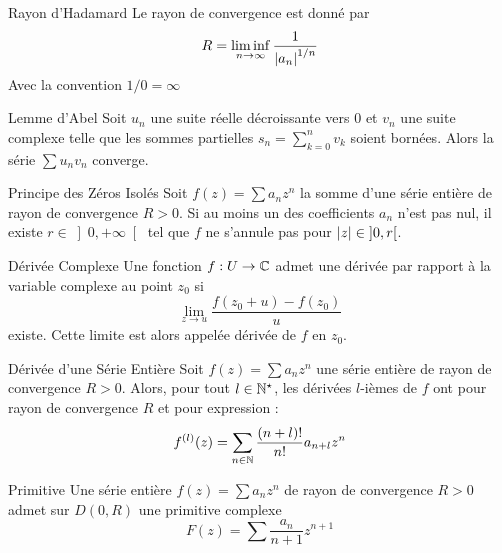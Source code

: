\documentclass{cours}
\begin{document}
\begin{propositionfr}{Rayon d'Hadamard}{}
    Le rayon de convergence est donné par 
    \[
        R = \liminf_{n \to \infty}\frac{1}{\left|a_{n}\right|^{1/n}}
    \]
    Avec la convention $1/0 = \infty$
\end{propositionfr}

\begin{lemme}{Lemme d'Abel}{}
    Soit $u_{n}$ une suite réelle décroissante vers $0$ et $v_{n}$ une suite complexe telle que les sommes partielles $s_{n} = \sum_{k = 0}^{n} v_{k}$ soient bornées. Alors la série $\sum u_{n}v_{n}$ converge.
\end{lemme}

\begin{propositionfr}{Principe des Zéros Isolés}{}
    Soit $f(z) = \sum a_{n}z^{n}$ la somme d'une série entière de rayon de convergence $R > 0$. Si au moins un des coefficients $a_{n}$ n'est pas nul, il existe $r \in \left] 0, +\infty\right[$ tel que $f$ ne s'annule pas pour $\left|z\right| \in \left]0, r\right[$.
\end{propositionfr}

\begin{définition}{Dérivée Complexe}{}
    Une fonction $f : U \to \mathbb{C}$ admet une dérivée par rapport à la variable complexe au point $z_{0}$ si
    \[
        \lim_{z \to u} \frac{f(z_{0} + u)- f(z_{0})}{u}
    \]
    existe. Cette limite est alors appelée dérivée de $f$ en $z_{0}$.
\end{définition}

\begin{propositionfr}{Dérivée d'une Série Entière}{}
    Soit $f(z) = \sum a_{n}z^{n}$ une série entière de rayon de convergence $R > 0$. Alors, pour tout $l \in \mathbb{N}^{\star}$, les dérivées $l$-ièmes de $f$ ont pour rayon de convergence $R$ et pour expression : 
    \[
        f^{(l)}(z) = \sum_{n \in \mathbb{N}}\frac{(n + l)!}{n!}a_{n + l}z^{n}  
    \]
\end{propositionfr}

\begin{corollaire}{Primitive}{}
    Une série entière $f(z) = \sum a_{n}z^{n}$ de rayon de convergence $R > 0$ admet sur $D(0, R)$ une primitive complexe
    \[
        F(z) = \sum \frac{a_{n}}{n + 1}z^{n + 1}
    \]
\end{corollaire}
\end{document}
